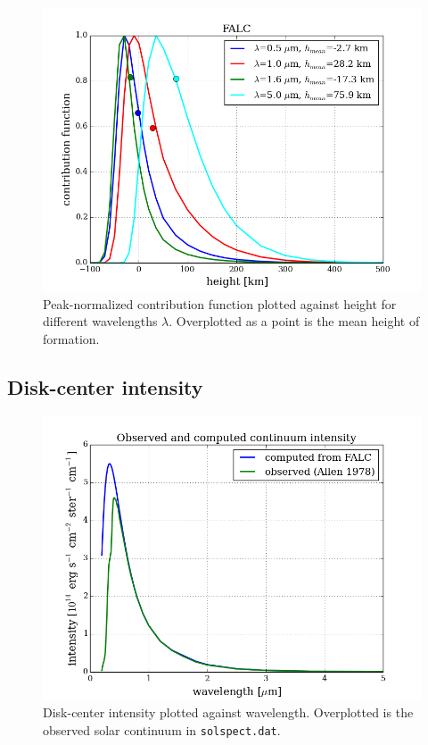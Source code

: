 \documentclass{article}
\begin{document}
\begin{figure}[H]
  \centering
  \includegraphics[scale=0.5]{../figures/task2/emergent_intensity_2.png}
  \caption{Peak-normalized contribution function plotted against height for different wavelengths $\lambda$. Overplotted as a point is the mean height of formation.}
\end{figure}

\subsection{Disk-center intensity}
\begin{figure}[H]
  \centering
  \includegraphics[scale=0.5]{../figures/task2/disc_center.png}
  \caption{Disk-center intensity plotted against wavelength. Overplotted is the observed solar continuum in \texttt{solspect.dat}.}
\end{figure}
\end{document}
